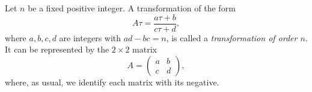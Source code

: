 Let $n$ be a fixed positive integer. A transformation of the form
$$A\tau = \frac{a\tau + b}{c\tau + d},$$
where $a, b, c, d$ are integers with $ad - bc = n$, is called a \emph{transformation of order $n$}. It can be represented by the $2 \times 2$ matrix
$$A = \begin{pmatrix} a & b \\ c & d \end{pmatrix},$$
where, as usual, we identify each matrix with its negative.
